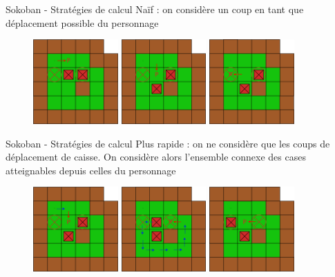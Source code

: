 \documentclass{beamer}
\begin{document}
\begin{frame}{Sokoban - Stratégies de calcul}
	\pause
	Naïf : on considère un coup en tant que déplacement possible du personnage
	\begin{figure}[!h]
		\pause
		\includegraphics[width=3.25cm]{Coup1_strat1.eps}
		\includegraphics[width=3.25cm]{Coup2_strat1.eps}
		\includegraphics[width=3.25cm]{Coup3_strat1.eps}
	\end{figure}
\end{frame}

\begin{frame}{Sokoban - Stratégies de calcul}
	\pause
	Plus rapide : on ne considère que les coups de déplacement de caisse. On considère alors l'ensemble connexe des cases atteignables depuis celles du personnage
	\begin{figure}[!h]
		\pause
		\includegraphics[width=3.25cm]{Coup1_strat2.eps}
		\includegraphics[width=3.25cm]{Coup2_strat2.eps}
		\includegraphics[width=3.25cm]{Coup3_strat2.eps}
	\end{figure}
\end{frame}
\end{document}
